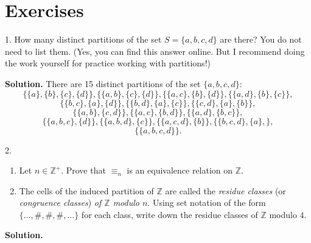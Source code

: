 \documentclass[10pt,]{book}
\theoremstyle{plain}
\theoremstyle{definition}
\theoremstyle{definition}
\theoremstyle{definition}
\theoremstyle{definition}
\numberwithin{equation}{section}
\def\Z{\mathbb{Z}}
\begin{document}
\section[{Exercises}]{Exercises}\label{exercises-8}
\begin{exerciselist}
\item[1.]\hypertarget{exercise-50}{}How many distinct partitions of the set \(S=\{a,b,c,d\}\) are there? You do not need to list them. (Yes, you can find this answer online. But I recommend doing the work yourself for practice working with partitions!)%
\par\smallskip
\par\smallskip
\noindent\textbf{Solution.}\hypertarget{solution-50}{}\quad
There are 15 distinct partitions of the set \(\{a,b,c,d\}\):%
\begin{equation*}
\{\{a\},\{b\},\{c\},\{d\}\}, \{\{a,b\},\{c\},\{d\}\},\{\{a,c\},\{b\},\{d\}\},\{\{a,d\},\{b\},\{c\}\},
\end{equation*}
%
\begin{equation*}
\{\{b,c\},\{a\},\{d\}\},\{\{b,d\},\{a\},\{c\}\},\{\{c,d\},\{a\},\{b\}\},
\end{equation*}
%
\begin{equation*}
\{\{a,b\},\{c,d\}\},
\{\{a,c\},\{b,d\}\},\{\{a,d\},\{b,c\}\},
\end{equation*}
%
\begin{equation*}
\{\{a,b,c\},\{d\}\},\{\{a,b,d\},\{c\}\},\{\{a,c,d\},\{b\}\},\{\{b,c,d\},\{a\},\},
\end{equation*}
%
\begin{equation*}
\{\{a,b,c,d\}\}.
\end{equation*}
%
\item[2.]\hypertarget{exercise-51}{}\leavevmode%
\begin{enumerate}[label=(\alph*)]
\item\hypertarget{li-416}{}Let  \(n\in \Z^+\). Prove that  \(\equiv_n\) is an equivalence relation on \(\Z\).%
\item\hypertarget{li-417}{}The cells of the induced partition of \(\Z\) are called the \emph{residue classes} (or \emph{congruence classes}) \emph{of \(\Z\) modulo \(n\)}.  Using set notation of the form \(\{\ldots,\#, \#,\#,\ldots\}\) for each class, write down the residue classes of \(\Z\) modulo \(4\).%
\end{enumerate}
%
\par\smallskip
\par\smallskip
\noindent\textbf{Solution.}\hypertarget{solution-51}{}\quad

\end{exerciselist}
\end{document}
